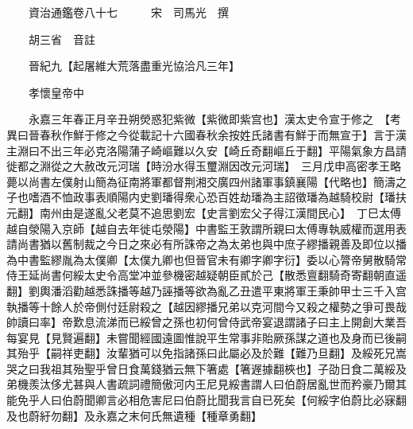 










 


 
 


 

  
  
  
  
  





  
  
  
  
  
 
  

  

  
  
  



  

 
 

  
   




  

  
  


  　　資治通鑑卷八十七　　　宋　司馬光　撰

　　胡三省　音註

　　晉紀九【起屠維大荒落盡重光協洽凡三年】

　　孝懷皇帝中

　　永嘉三年春正月辛丑朔熒惑犯紫微【紫微即紫宫也】漢太史令宣于修之　【考異曰晉春秋作鮮于修之今從載記十六國春秋余按姓氏諸書有鮮于而無宣于】言于漢主淵曰不出三年必克洛陽蒲子崎嶇難以久安【崎丘奇翻嶇丘于翻】平陽氣象方昌請徙都之淵從之大赦改元河瑞【時汾水得玉璽淵因改元河瑞】　三月戊申高密孝王略薨以尚書左僕射山簡為征南將軍都督荆湘交廣四州諸軍事鎮襄陽【代略也】簡濤之子也嗜酒不恤政事表順陽内史劉璠得衆心恐百姓劫璠為主詔徵璠為越騎校尉【璠扶元翻】南州由是遂亂父老莫不追思劉宏【史言劉宏父子得江漢間民心】　丁巳太傅越自滎陽入京師【越自去年徙屯滎陽】中書監王敦謂所親曰太傅專執威權而選用表請尚書猶以舊制裁之今日之來必有所誅帝之為太弟也與中庶子繆播親善及即位以播為中書監繆胤為太僕卿【太僕九卿也但晉官未有卿字卿字衍】委以心膂帝舅散騎常侍王延尚書何綏太史令高堂冲並參機密越疑朝臣貳於己【散悉亶翻騎奇寄翻朝直遥翻】劉輿潘滔勸越悉誅播等越乃誣播等欲為亂乙丑遣平東將軍王秉帥甲士三千入宫執播等十餘人於帝側付廷尉殺之【越因繆播兄弟以克河間今又殺之權勢之爭可畏哉帥讀曰率】帝歎息流涕而已綏曾之孫也初何曾侍武帝宴退謂諸子曰主上開創大業吾每宴見【見賢遍翻】未嘗聞經國遠圖惟說平生常事非貽厥孫謀之道也及身而已後嗣其殆乎【嗣祥吏翻】汝輩猶可以免指諸孫曰此屬必及於難【難乃旦翻】及綏死兄嵩哭之曰我祖其殆聖乎曾日食萬錢猶云無下箸處【箸遟據翻梜也】子劭日食二萬綏及弟機羨汰侈尤甚與人書疏詞禮簡傲河内王尼見綏書謂人曰伯蔚居亂世而矜豪乃爾其能免乎人曰伯蔚聞卿言必相危害尼曰伯蔚比聞我言自已死矣【何綏字伯蔚比必寐翻及也蔚紆勿翻】及永嘉之末何氏無遺種【種章勇翻】

